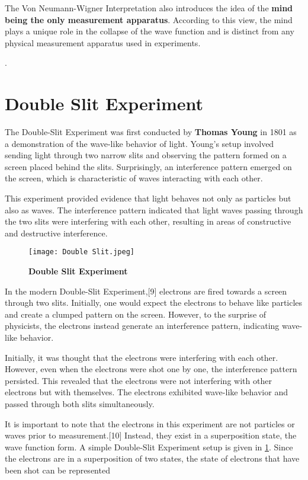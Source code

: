 \documentclass{article}
\begin{document}
The Von Neumann-Wigner Interpretation also introduces the idea of the \textbf{mind being the only measurement apparatus}. According to this view, the mind plays a unique role in the collapse of the wave function and is distinct from any physical measurement apparatus used in experiments.

.

\section{\Large \textbf{Double Slit Experiment}}

The Double-Slit Experiment was first conducted by \textbf{Thomas Young} in 1801 as a demonstration of the wave-like behavior of light. Young's setup involved sending light through two narrow slits and observing the pattern formed on a screen placed behind the slits. Surprisingly, an interference pattern emerged on the screen, which is characteristic of waves interacting with each other.

This experiment provided evidence that light behaves not only as particles but also as waves. The interference pattern indicated that light waves passing through the two slits were interfering with each other, resulting in areas of constructive and destructive interference.

\begin{figure}[h]
\centering
     \texttt{[image: Double Slit.jpeg]}
      \caption{\textbf{Double Slit Experiment}}
       \label{fig:DSE}
\end{figure}

In the modern Double-Slit Experiment,[9] electrons are fired towards a screen through two slits. Initially, one would expect the electrons to behave like particles and create a clumped pattern on the screen. However, to the surprise of physicists, the electrons instead generate an interference pattern, indicating wave-like behavior.

Initially, it was thought that the electrons were interfering with each other. However, even when the electrons were shot one by one, the interference pattern persisted. This revealed that the electrons were not interfering with other electrons but with themselves. The electrons exhibited wave-like behavior and passed through both slits simultaneously.

It is important to note that the electrons in this experiment are not particles or waves prior to measurement.[10] Instead, they exist in a superposition state, the wave function form. A
simple Double-Slit Experiment setup is given in \ref{fig:DSE}.
Since the electrons are in a superposition of two states, the
state of electrons that have been shot can be represented
\end{document}
